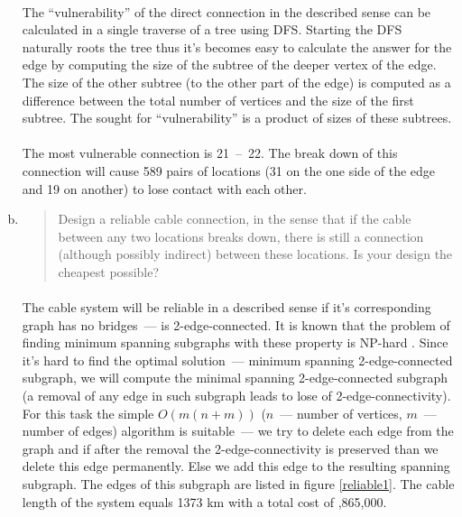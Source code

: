 \begin{enumerate}[(a)]
\paragraph{}
	The ``vulnerability'' of the direct connection in the described sense can be calculated in a single traverse of a tree using DFS. Starting the DFS naturally roots the tree thus it's becomes easy to calculate the answer for the edge by computing the size of the subtree of the deeper vertex of the edge. The size of the other subtree (to the other part of the edge) is computed as a difference between the total number of vertices and the size of the first subtree. The sought for ``vulnerability'' is a product of sizes of these subtrees.

\paragraph{}
	The most vulnerable connection is 21~--~22. The break down of this connection will cause 589 pairs of locations (31 on the one side of the edge and 19 on another) to lose contact with each other.

\item \begin{quote}Design a reliable cable connection, in the sense that if the cable between any
two locations breaks down, there is still a connection (although possibly indirect)
between these locations. Is your design the cheapest possible?\end{quote}

\paragraph{}
	The cable system will be reliable in a described sense if it's corresponding graph has no bridges~--- is 2-edge-connected. It is known that the problem of finding minimum spanning subgraphs with these property is NP-hard \cite{garey79}. Since it's hard to find the optimal solution~--- minimum spanning 2-edge-connected subgraph, we will compute the minimal spanning 2-edge-connected subgraph (a removal of any edge in such subgraph leads to lose of 2-edge-connectivity). For this task the simple $O(m(n+m))$ ($n$~--- number of vertices, $m$~--- number of edges) algorithm is suitable~--- we try to delete each edge from the graph and if after the removal the 2-edge-connectivity is preserved than we delete this edge permanently. Else we add this edge to the resulting spanning subgraph. The edges of this subgraph are listed in figure \ref{reliable1}. The cable length of the system equals 1373 km with a total cost of ,865,000.


\end{enumerate}
